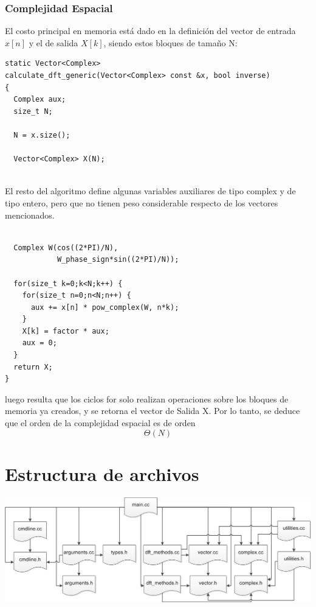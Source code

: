\documentclass{article}
\begin{document}
\subsubsection{Complejidad Espacial}
 El costo principal en memoria está dado en la definición del vector de entrada $x[n]$ y el de salida $X[k]$, siendo estos bloques de tamaño N:\\
\begin{verbatim}
static Vector<Complex>
calculate_dft_generic(Vector<Complex> const &x, bool inverse)
{
  Complex aux;
  size_t N;
  
  N = x.size();
  
  Vector<Complex> X(N);
 
 \end{verbatim}
 El resto del algoritmo define algunas variables auxiliares de tipo complex y de tipo entero, pero que no tienen peso considerable respecto de los vectores mencionados.
 \begin{verbatim}
 
  Complex W(cos((2*PI)/N),
            W_phase_sign*sin((2*PI)/N));
  
  for(size_t k=0;k<N;k++) {
    for(size_t n=0;n<N;n++) {
      aux += x[n] * pow_complex(W, n*k);
    }
    X[k] = factor * aux; 
    aux = 0;
  }
  return X;
}
\end{verbatim}
luego resulta que los ciclos for solo realizan operaciones sobre los bloques de memoria ya creados, y se retorna el vector de Salida X. Por lo tanto, se deduce que el orden de la complejidad espacial es de orden  $$ \boxed{\Theta(N)}$$

\section{Estructura de archivos}

\begin{center}
  \includegraphics[width=0.8\paperwidth]{Imagenes/jerarquia_de_archivos}
\par
\end{center}
\end{document}
